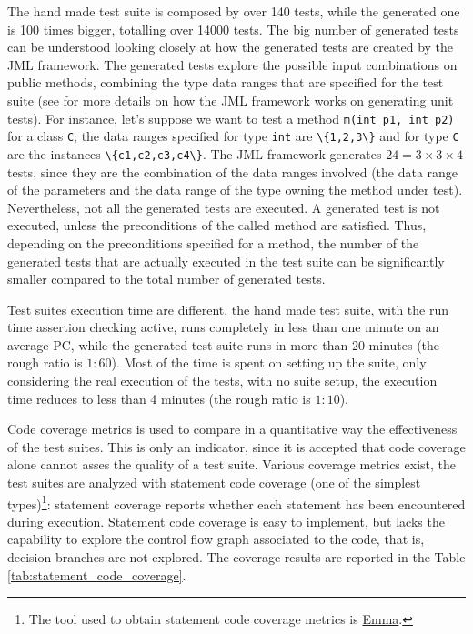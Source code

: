 \documentclass[english]{lni}
\newcommand{\myhref}[2]{\ifpdf\href{#1}{#2}\else\htmladdnormallinkfoot{#2}{#1}\fi}
\newcommand{\lil}[1]{\texttt{\lstinline|#1|}}
\begin{document}
The hand made test suite is composed by over 140 tests, while the generated one is 100 times bigger, totalling over 14000 tests.
The big number of generated tests can be understood looking closely at how the generated tests are created by the JML framework. 
The generated tests explore the possible input combinations on public methods, combining the type data ranges that are specified for the test suite (see \cite{Cheon-Leavens02} for more details on how the JML framework works on generating unit tests). 
For instance, let's suppose we want to test a method \lil{m(int p1, int p2)} for a class \lil{C}; the data ranges specified for type \lil{int} are \lil{\{1,2,3\}} and for type \lil{C} are the instances \lil{\{c1,c2,c3,c4\}}. 
The JML framework generates $24 = 3 \times 3 \times 4$ tests, since they are the combination of the data ranges involved (the data range of the parameters and the data range of the type owning the method under test). 
Nevertheless, not all the generated tests are executed.
A generated test is not executed, unless the preconditions of the called method are satisfied. 
Thus, depending on the preconditions specified for a method, the number of the generated tests that are actually executed in the test suite can be significantly smaller compared to the total number of generated tests.

Test suites execution time are different, the hand made test suite, with the run time assertion checking active, runs completely in less than one minute on an average PC, while the generated test suite runs in more than 20 minutes (the rough ratio is $ 1 : 60 $). 
Most of the time is spent on setting up the suite, only considering the real execution of the tests, with no suite setup, the execution time reduces to less than 4 minutes (the rough ratio is $ 1 : 10 $).

Code coverage metrics is used to compare in a quantitative way the effectiveness of the test suites. 
This is only an indicator, since it is accepted that code coverage alone cannot asses the quality of a test suite\cite{Marick1999,Chockler2006}.
Various coverage metrics exist, the test suites are analyzed with statement code coverage (one of the simplest types)\footnote{The tool used to obtain statement code coverage metrics is \myhref{http://emma.sourceforge.net/}{Emma}.}: statement coverage reports whether each statement has been encountered during execution. 
Statement code coverage is easy to implement, but lacks the capability to explore the control flow graph associated to the code, that is,
decision branches are not explored. 
The coverage results are reported in the Table \ref{tab:statement_code_coverage}.
\end{document}
